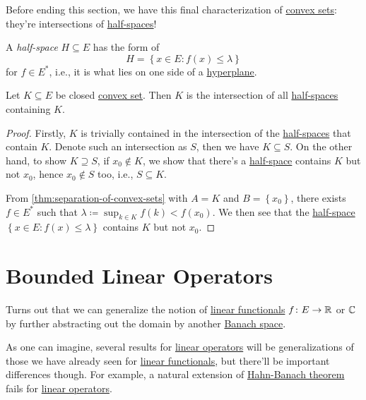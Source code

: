 Before ending this section, we have this final characterization of \hyperref[def:convex-set]{convex sets}: they're intersections of \hyperref[def:half-space]{half-spaces}!

\begin{definition}\label{def:half-space}
	A \emph{half-space} \(H \subseteq E\) has the form of
	\[
		H = \left\{ x\in E\colon f(x) \leq \lambda  \right\}
	\]
	for \(f\in E^{\ast} \), i.e., it is what lies on one side of a \hyperref[def:hyperplane]{hyperplane}.
\end{definition}

\begin{corollary}
	Let \(K\subseteq E\) be closed \hyperref[def:convex-set]{convex set}. Then \(K\) is the intersection of all \hyperref[def:half-space]{half-spaces} containing \(K\).
\end{corollary}
\begin{proof}
	Firstly, \(K\) is trivially contained in the intersection of the \hyperref[def:half-space]{half-spaces} that contain \(K\). Denote such an intersection as \(S\), then we have \(K \subseteq S\). On the other hand, to show \(K \supseteq S\), if \(x_0 \notin K\), we show that there's a \hyperref[def:half-space]{half-space} contains \(K\) but not \(x_0\), hence \(x_0 \notin S\) too, i.e., \(S \subseteq K\).

	From \autoref{thm:separation-of-convex-sets} with \(A = K\) and \(B = \left\{ x_0 \right\}\), there exists \(f\in E^{\ast} \) such that \(\lambda \coloneqq \sup _{k\in K}f(k) < f(x_0)\). We then see that the \hyperref[def:half-space]{half-space} \(\left\{ x\in E \colon f(x) \leq \lambda  \right\} \) contains \(K\) but not \(x_0\).
\end{proof}

\section{Bounded Linear Operators}
Turns out that we can generalize the notion of \hyperref[def:linear-functional]{linear functionals} \(f\colon E\to \mathbb{\MakeUppercase{r}} \) or \(\mathbb{\MakeUppercase{c}} \) by further abstracting out the domain by another \hyperref[def:Banach-space]{Banach space}.

As one can imagine, several results for \hyperref[def:linear-op]{linear operators} will be generalizations of those we have already seen for \hyperref[def:linear-functional]{linear functionals}, but there'll be important differences though. For example, a natural extension of \hyperref[thm:Hahn-Banach]{Hahn-Banach theorem} fails for \hyperref[def:linear-op]{linear operators}.

